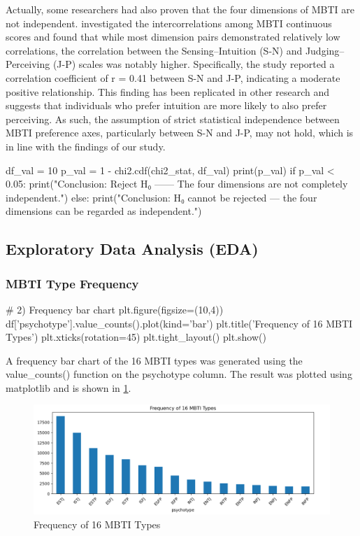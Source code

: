 \documentclass[12pt]{article}
\numberwithin{figure}{section}  %
\begin{document}
	Actually, some researchers had also proven that the four
	dimensions of MBTI are not independent. 
	investigated the intercorrelations among MBTI continuous scores and found
	that while most dimension pairs demonstrated relatively low correlations,
	the correlation between the Sensing–Intuition (S-N) and Judging–Perceiving
	(J-P) scales was notably higher. Specifically, the study reported a
	correlation coefficient of r = 0.41 between S-N and J-P, indicating a moderate
	positive relationship. This finding has been replicated in other research
	and suggests that individuals who prefer intuition are more likely to also
	prefer perceiving. As such, the assumption of strict statistical
	independence between MBTI preference axes, particularly between S-N and J-P,
	may not hold, which is in line with the findings of our study.
	\begin{python}
df_val = 10
p_val = 1 - chi2.cdf(chi2_stat, df_val)
print(p_val)
if p_val < 0.05:
    print("Conclusion: Reject H₀ —— The four dimensions are not completely independent.")
else:
    print("Conclusion: H₀ cannot be rejected — the four dimensions can be regarded as independent.")

	\end{python}

\subsection{Exploratory Data Analysis (EDA)}
\subsubsection{MBTI Type Frequency}
	\begin{python}
# 2) Frequency bar chart
plt.figure(figsize=(10,4))
df['psychotype'].value_counts().plot(kind='bar')
plt.title('Frequency of 16 MBTI Types')
plt.xticks(rotation=45)
plt.tight_layout()
plt.show()
	\end{python}
	
	A frequency bar chart of the 16 MBTI types was generated using the
	value\_counts() function on the psychotype column. The result was plotted
	using matplotlib and is shown in \cref{mbtidist}.
	\begin{figure}[H]
		\centering
		\includegraphics{Q1EDA2} 
		\caption{Frequency of 16 MBTI Types}	
		\label{mbtidist}	
	\end{figure}
	
\end{document}
